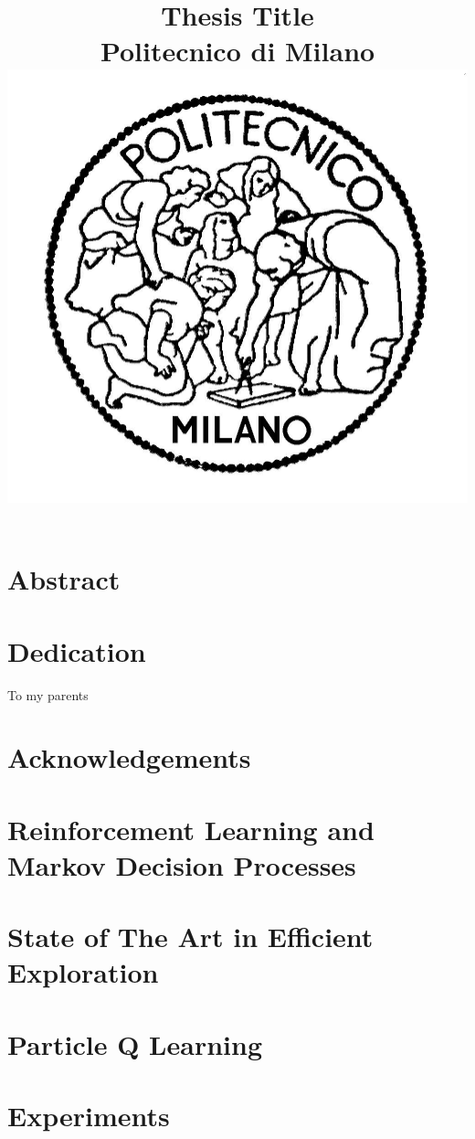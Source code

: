 \documentclass[11pt]{report}
\begin{document}
\title{
	{Thesis Title}\\
	{\large Politecnico di Milano}\\
	{\includegraphics{Logo-pol.jpg}}
}
\chapter*{Abstract}

\chapter*{Dedication}
To my parents

\chapter*{Acknowledgements}
\tableofcontents

\listoffigures

\listoftables

\listofalgorithms
\chapter{Reinforcement Learning and Markov Decision Processes}

\chapter{State of The Art in Efficient Exploration}

\chapter{Particle Q Learning}

\chapter{Experiments}



\end{document}
